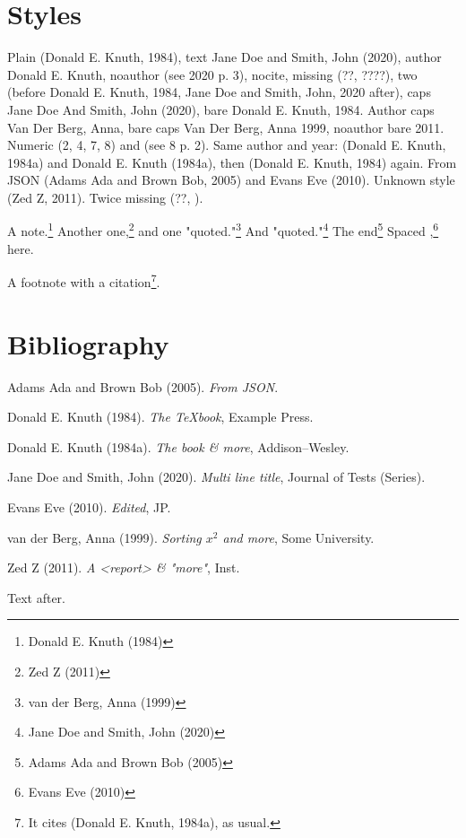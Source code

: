 \section{Styles}
\label{sec:org0e4d337}
Plain (Donald E. Knuth, 1984), text Jane Doe and Smith, John (2020), author Donald E. Knuth,
noauthor (see 2020 p. 3), nocite, missing (??, ????),
two (before Donald E. Knuth, 1984,  Jane Doe and Smith, John, 2020 after), caps Jane Doe And Smith, John (2020), bare Donald E. Knuth, 1984.
Author caps Van Der Berg, Anna, bare caps Van Der Berg, Anna 1999, noauthor bare 2011.
Numeric (2, 4, 7, 8) and (see 8 p. 2).
Same author and year: (Donald E. Knuth, 1984a) and Donald E. Knuth (1984a), then (Donald E. Knuth, 1984) again.
From JSON (Adams Ada and Brown Bob, 2005) and Evans Eve (2010).
Unknown style (Zed Z, 2011).  Twice missing (??, ).

A note.\footnote{Donald E. Knuth (1984)} Another one,\footnote{Zed Z (2011)} and one "quoted."\footnote{van der Berg, Anna (1999)}
And "quoted."\footnote{Jane Doe and Smith, John (2020)} The end\footnote{Adams Ada and Brown Bob (2005)}
Spaced ,\footnote{Evans Eve (2010)}  here.

A footnote with a citation\footnote{It cites (Donald E. Knuth, 1984a), as usual.}.
\section{Bibliography}
\label{sec:org3028fdc}
\noindent
Adams Ada and Brown Bob (2005). \emph{From JSON}.

\noindent
Donald E. Knuth (1984). \emph{The {\TeX}book}, Example Press.

\noindent
Donald E. Knuth (1984a). \emph{The \METAFONT book \& more}, Addison--Wesley.

\noindent
Jane Doe and Smith, John (2020). \emph{Multi line title}, Journal of Tests (Series).

\noindent
Evans Eve (2010). \emph{Edited}, JP.

\noindent
van der Berg, Anna (1999). \emph{Sorting $x^2$ and \alpha{} more}, Some University.

\noindent
Zed Z (2011). \emph{A <report> & "more"}, Inst.

Text after.
